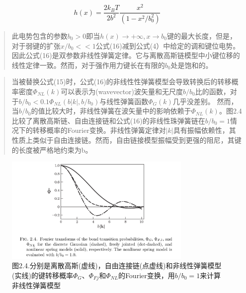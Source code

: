 			\begin{equation}
			h(x)=\frac{2k_{B}T}{2b^2}\frac{x^2}{(1-x^2/b_{0}^2)}
			\end{equation}
			\begin{quotation}
				此电势包含的参数$b_{0}>0$即当$h(x)\to +\infty,x\to b_{0}$键的最大长度，但是，对于弱键的扩张$x/b_{0}<<1$公式(16)减到公式(4）中给定的调和键位电势。因此公式(16)是双参数非线性弹簧定律。它与离散高斯链模型中小键位移的线性定律一致。然而，对于强作用力键长在有限的$b_{0}$处是饱和的。
			\end{quotation}
			\begin{quotation}
				当被替换公式(15)时，公式(16)的非线性性弹簧模型会导致转换后的转移概率密度$\varPhi_{NL}(k)$可以表示为(wavevector)波矢量和无尺度$b/b_{0}$比的函数，对于$b/b_{0}<0.1 \varPhi_{NL}(b|k|,b/b_{0})$与线性弹簧函数$\varPhi_{G}(k)$几乎没差别。 然而，
				当$b/b_{0}$的值比较大时，非线性弹簧在波矢量中的影响依赖于$\varPhi_{NL}(k)$。图2.4比较了离散高斯链、自由连接链和公式(16)的非线性珠弹簧链在$b/b_{0}=1$情况下的转移概率的Fourier变换。非线性弹簧定律对$|k|$具有振幅依赖性，其性质上类似于自由连接链。然而，自由链接模型振幅受到更强的阻尼，其键的长度被严格地约束为b。
			\end{quotation}
			\begin{figure}[ht]
				\caption{图2.4.分别是离散高斯(虚线)，自由连接链(点虚线)和非线性弹簧模型(实线)的键转移概率$\varPhi_{G}$、$\varPhi_{Fj}$和$\varPhi_{NL}$的Fourier变换，用$b/b_{0}=1$来计算非线性弹簧模型}
				\centering
				\includegraphics[width=9cm]{./figures/2.png}
			\end{figure}
%
